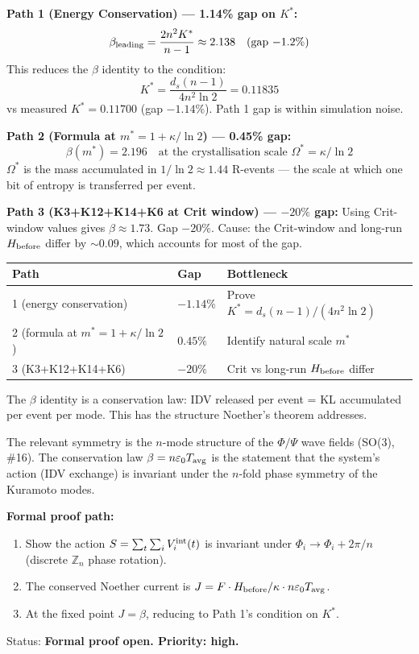 \documentclass[12pt, a4paper]{article}
\begin{document}
\begin{formalbox}[title={Three Paths to $\beta = d_s/(2\ln 2)$}]
\textbf{Path 1 (Energy Conservation) --- 1.14\% gap on $K^*$:}
\[
  \beta_{\rm leading} = \frac{2n^2 K^*}{n-1} \approx 2.138 \quad\text{(gap $-1.2\%$)}
\]
This reduces the $\beta$ identity to the condition:
\[
  K^* = \frac{d_s(n-1)}{4n^2\ln 2} = 0.11835
\]
vs measured $K^* = 0.11700$ (gap $-1.14\%$). Path 1 gap is within simulation noise.

\textbf{Path 2 (Formula at $m^* = 1 + \kappa/\ln 2$) --- 0.45\% gap:}
\[
  \beta(m^*) = 2.196 \quad\text{at the crystallisation scale }\Omega^* = \kappa/\ln 2
\]
$\Omega^*$ is the mass accumulated in $1/\ln 2 \approx 1.44$ R-events --- the scale at which one bit of entropy is transferred per event.

\textbf{Path 3 (K3+K12+K14+K6 at Crit window) --- $-20\%$ gap:}
Using Crit-window values gives $\beta\approx 1.73$. Gap $-20\%$. Cause: the Crit-window and long-run $H_{\rm before}$ differ by $\sim 0.09$, which accounts for most of the gap.

\begin{center}
\begin{tabular}{p{5cm} p{1.5cm} p{4cm}}
\toprule
Path & Gap & Bottleneck \\
\midrule
1 (energy conservation) & $-1.14\%$ & Prove $K^* = d_s(n-1)/(4n^2\ln 2)$ \\
2 (formula at $m^* = 1+\kappa/\ln 2$) & $0.45\%$ & Identify natural scale $m^*$ \\
3 (K3+K12+K14+K6) & $-20\%$ & Crit vs long-run $H_{\rm before}$ differ \\
\bottomrule
\end{tabular}
\end{center}
\end{formalbox}

\begin{derivedbox}[title={Noether Structure of $\beta$ (CRF\_Beta\_Noether)}]
The $\beta$ identity is a conservation law: IDV released per event = KL accumulated per event per mode. This has the structure Noether's theorem addresses.

The relevant symmetry is the $n$-mode structure of the $\Phi/\Psi$ wave fields (SO(3), \#16). The conservation law $\beta = n\varepsilon_0 T_{\rm avg}$ is the statement that the system's action (IDV exchange) is invariant under the $n$-fold phase symmetry of the Kuramoto modes.

\textbf{Formal proof path:}
\begin{enumerate}
\item Show the action $S = \sum_t\sum_i V_i^{\rm int}(t)$ is invariant under $\Phi_i\to\Phi_i + 2\pi/n$ (discrete $\mathbb{Z}_n$ phase rotation).
\item The conserved Noether current is $J = F\cdot H_{\rm before}/\kappa\cdot n\varepsilon_0 T_{\rm avg}$.
\item At the fixed point $J = \beta$, reducing to Path 1's condition on $K^*$.
\end{enumerate}
Status: \textbf{Formal proof open. Priority: high.}
\end{derivedbox}
\end{document}
